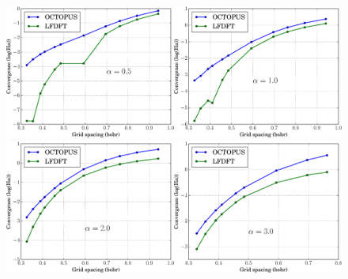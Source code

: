 \documentclass{article}
\begin{document}
\thispagestyle{empty}

\begin{figure}
\includegraphics[width=0.5\textwidth]{CONV_A_10_alpha_0_5.pdf}\includegraphics[width=0.5\textwidth]{CONV_A_10_alpha_1.pdf}
\includegraphics[width=0.5\textwidth]{CONV_A_10_alpha_2.pdf}\includegraphics[width=0.5\textwidth]{CONV_A_10_alpha_3.pdf}
\end{figure}
\end{document}
